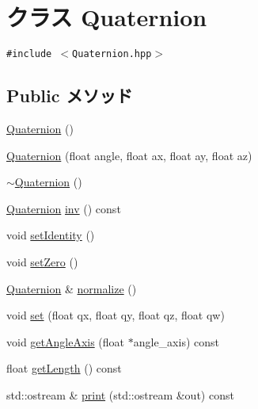 \hypertarget{classm3g_1_1Quaternion}{
\section{クラス Quaternion}
\label{classm3g_1_1Quaternion}
}
{\tt \#include $<$Quaternion.hpp$>$}

\subsection*{Public メソッド}
\begin{CompactItemize}
\item 
\hyperlink{classm3g_1_1Quaternion_65ed15cc19af958b5933b5c522f10e66}{Quaternion} ()
\item 
\hyperlink{classm3g_1_1Quaternion_7a06a28b864e525f73a1bb0eb3e9274e}{Quaternion} (float angle, float ax, float ay, float az)
\item 
\hyperlink{classm3g_1_1Quaternion_6e9a147677b9ffd583c59e9d06c3d938}{$\sim$Quaternion} ()
\item 
\hyperlink{classm3g_1_1Quaternion}{Quaternion} \hyperlink{classm3g_1_1Quaternion_c544c21c80182fc0a7f2c9dbe5f42a0a}{inv} () const 
\item 
void \hyperlink{classm3g_1_1Quaternion_382e6ad7e6721b121e510959e1011be3}{setIdentity} ()
\item 
void \hyperlink{classm3g_1_1Quaternion_47affd1a10b589811fc4828c1a2e0c6d}{setZero} ()
\item 
\hyperlink{classm3g_1_1Quaternion}{Quaternion} \& \hyperlink{classm3g_1_1Quaternion_c9cc178bcc449e08499113c35feb2a2b}{normalize} ()
\item 
void \hyperlink{classm3g_1_1Quaternion_0712dc357557a30ac0da0a9d4cdd278c}{set} (float qx, float qy, float qz, float qw)
\item 
void \hyperlink{classm3g_1_1Quaternion_3049675269aef6bb333d8f83fdf6eed7}{getAngleAxis} (float $\ast$angle\_\-axis) const 
\item 
float \hyperlink{classm3g_1_1Quaternion_b4393f1928cea2a3baadbf9acdd99de2}{getLength} () const 
\item 
std::ostream \& \hyperlink{classm3g_1_1Quaternion_6fea17fa1532df3794f8cb39cb4f911f}{print} (std::ostream \&out) const 
\end{CompactItemize}
